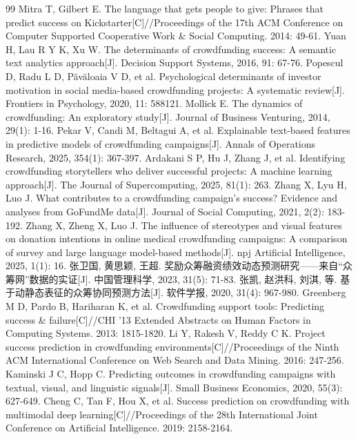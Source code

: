 \newpage
{}
\begin{thebibliography}{99}
 Mitra T, Gilbert E. The language that gets people to give: Phrases that predict success on Kickstarter[C]//Proceedings of the 17th ACM Conference on Computer Supported Cooperative Work \& Social Computing. 2014: 49-61.
 Yuan H, Lau R Y K, Xu W. The determinants of crowdfunding success: A semantic text analytics approach[J]. Decision Support Systems, 2016, 91: 67-76.
 Popescul D, Radu L D, P\u{a}v\u{a}loaia V D, et al. Psychological determinants of investor motivation in social media-based crowdfunding projects: A systematic review[J]. Frontiers in Psychology, 2020, 11: 588121.
 Mollick E. The dynamics of crowdfunding: An exploratory study[J]. Journal of Business Venturing, 2014, 29(1): 1-16.
 Pekar V, Candi M, Beltagui A, et al. Explainable text-based features in predictive models of crowdfunding campaigns[J]. Annals of Operations Research, 2025, 354(1): 367-397.
 Ardakani S P, Hu J, Zhang J, et al. Identifying crowdfunding storytellers who deliver successful projects: A machine learning approach[J]. The Journal of Supercomputing, 2025, 81(1): 263.
 Zhang X, Lyu H, Luo J. What contributes to a crowdfunding campaign's success? Evidence and analyses from GoFundMe data[J]. Journal of Social Computing, 2021, 2(2): 183-192.
 Zhang X, Zheng X, Luo J. The influence of stereotypes and visual features on donation intentions in online medical crowdfunding campaigns: A comparison of survey and large language model-based methods[J]. npj Artificial Intelligence, 2025, 1(1): 16.
 张卫国, 黄思颖, 王超. 奖励众筹融资绩效动态预测研究——来自“众筹网”数据的实证[J]. 中国管理科学, 2023, 31(5): 71-83.
 张凯, 赵洪科, 刘淇, 等. 基于动静态表征的众筹协同预测方法[J]. 软件学报, 2020, 31(4): 967-980.
 Greenberg M D, Pardo B, Hariharan K, et al. Crowdfunding support tools: Predicting success \& failure[C]//CHI '13 Extended Abstracts on Human Factors in Computing Systems. 2013: 1815-1820.
 Li Y, Rakesh V, Reddy C K. Project success prediction in crowdfunding environments[C]//Proceedings of the Ninth ACM International Conference on Web Search and Data Mining. 2016: 247-256.
 Kaminski J C, Hopp C. Predicting outcomes in crowdfunding campaigns with textual, visual, and linguistic signals[J]. Small Business Economics, 2020, 55(3): 627-649.
 Cheng C, Tan F, Hou X, et al. Success prediction on crowdfunding with multimodal deep learning[C]//Proceedings of the 28th International Joint Conference on Artificial Intelligence. 2019: 2158-2164.

\end{thebibliography}
